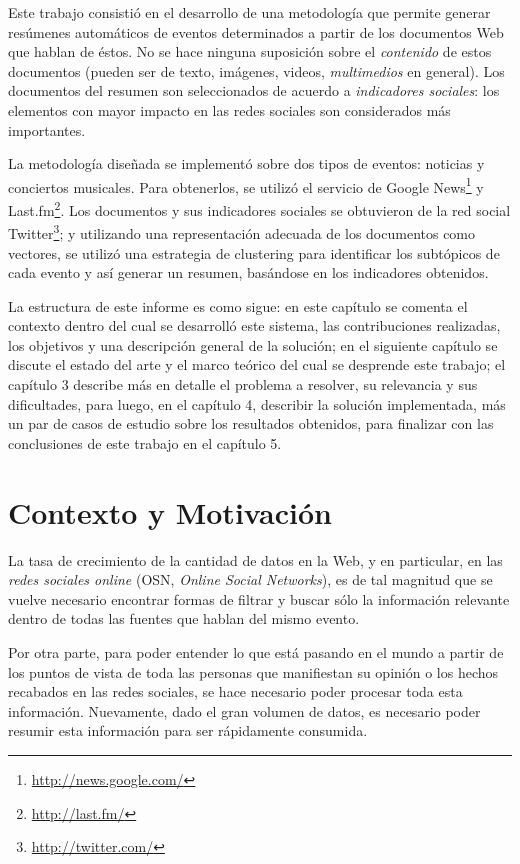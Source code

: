 \documentclass[upright, contnum]{umemoria}
\begin{document}
  Este trabajo consistió en el desarrollo de una metodología
  que permite generar resúmenes automáticos de eventos determinados
  a partir de los documentos Web que hablan de éstos. No se hace
  ninguna suposición sobre el \emph{contenido} de estos documentos (pueden
  ser de texto, imágenes, videos, \emph{multimedios} en general). Los
  documentos del resumen son seleccionados de acuerdo a 
  \emph{indicadores sociales}: los elementos con mayor impacto en las redes
  sociales son considerados más importantes.
  
  La metodología diseñada se implementó sobre dos tipos de eventos:
  noticias y conciertos musicales. Para obtenerlos, se utilizó
  el servicio de Google News\footnote{\href{http://news.google.com/}{http://news.google.com/} } y
  Last.fm\footnote{\href{http://last.fm/}{http://last.fm/} }. Los documentos y sus indicadores
  sociales se obtuvieron de la red social
  Twitter\footnote{\href{http://twitter.com/}{http://twitter.com/} }; y utilizando una representación
  adecuada de los documentos como vectores, se utilizó una estrategia
  de clustering para identificar los subtópicos de cada evento y así
  generar un resumen, basándose en los indicadores obtenidos.

  La estructura de este informe es como sigue: en este capítulo se
  comenta el contexto dentro del cual se desarrolló este sistema, las
  contribuciones realizadas, los objetivos y una descripción general
  de la solución; en el siguiente capítulo se discute el estado del
  arte y el marco teórico del cual se desprende este trabajo; el
  capítulo 3 describe más en detalle el problema a resolver, su
  relevancia y sus dificultades, para luego, en el
  capítulo 4, describir la solución implementada, más un par de casos
  de estudio sobre los resultados obtenidos, para finalizar con las
  conclusiones de este trabajo en el capítulo 5.

\section{Contexto y Motivación}
\label{sec-1.1}

   
   La tasa de crecimiento de la cantidad de datos en la Web, y en
   particular, en las \emph{redes sociales online} (OSN, \emph{Online Social Networks}),
   es de tal magnitud que se vuelve necesario encontrar formas de
   filtrar y buscar sólo la información relevante dentro de todas las
   fuentes que hablan del mismo evento. 

   Por otra parte, para poder entender lo que está pasando en el
   mundo a partir de los puntos de vista de toda las personas que
   manifiestan su opinión o los hechos recabados en las redes
   sociales, se hace necesario poder procesar toda esta
   información. Nuevamente, dado el gran volumen de datos, es
   necesario poder resumir esta información para ser rápidamente
   consumida. 
\end{document}
